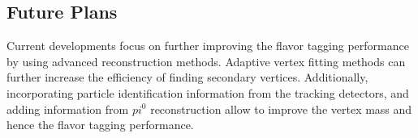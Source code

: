 \subsection{Future Plans}
Current developments focus on further improving the flavor tagging performance by using advanced reconstruction methods. Adaptive vertex fitting methods can further increase the efficiency of finding secondary vertices. Additionally, incorporating particle identification information from the tracking detectors, and adding information from $pi^0$ reconstruction allow to improve the vertex mass and hence the flavor tagging performance.

